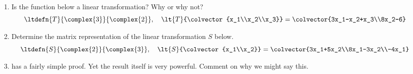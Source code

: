 \begin{enumerate}
%
\item Is the function below a linear transformation?  Why or why not?
%
\begin{equation*}
\ltdefn{T}{\complex{3}}{\complex{2}},\quad
\lt{T}{\colvector{x_1\\x_2\\x_3}}=\colvector{3x_1-x_2+x_3\\8x_2-6}
\end{equation*}
%
\item Determine the matrix representation of the linear transformation $S$ below.
%
\begin{equation*}
\ltdefn{S}{\complex{2}}{\complex{3}},\quad
\lt{S}{\colvector{x_1\\x_2}}=\colvector{3x_1+5x_2\\8x_1-3x_2\\-4x_1}
\end{equation*}
%
\item {} has a fairly simple proof.  Yet the result itself is very powerful.  Comment on why we might say this.
%
\end{enumerate}